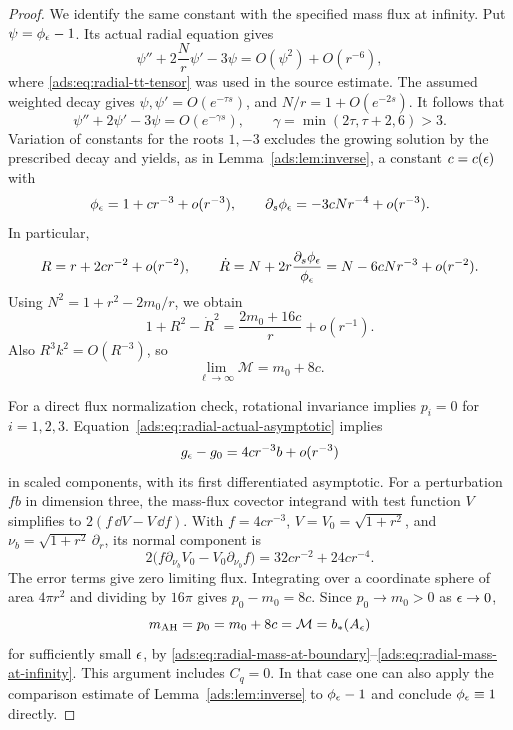 \begin{proof}
We identify the same constant with the specified mass flux at infinity.
Put $\psi=\phi_\epsilon-1$.  Its actual radial equation gives
\[
 \psi''+2\frac Nr\psi'-3\psi
 =O(\psi^2)+O(r^{-6}),
\]
where \eqref{ads:eq:radial-tt-tensor} was used in the source estimate.
The assumed weighted decay gives
$\psi,\psi'=O(e^{-\tau s})$, and $N/r=1+O(e^{-2s})$.
It follows that
\[
 \psi''+2\psi'-3\psi=O(e^{-\gamma s}),
 \qquad \gamma=\min(2\tau,\tau+2,6)>3.
\]
Variation of constants for the roots $1,-3$ excludes the growing
solution by the prescribed decay and yields, as in
Lemma~\ref{ads:lem:inverse}, a constant $c=c(\epsilon)$ with
\begin{equation}
 \phi_\epsilon=1+cr^{-3}+o(r^{-3}),
 \qquad
 \partial_s\phi_\epsilon=-3cNr^{-4}+o(r^{-3}).
 \label{ads:eq:radial-actual-asymptotic}
\end{equation}
In particular,
\[
 R=r+2cr^{-2}+o(r^{-2}),\qquad
 \dot R=N+2r\frac{\partial_s\phi_\epsilon}{\phi_\epsilon}
 =N-6cNr^{-3}+o(r^{-2}).
\]
Using $N^2=1+r^2-2m_0/r$, we obtain
\[
 1+R^2-\dot R^2
 =\frac{2m_0+16c}{r}+o(r^{-1}).
\]
Also $R^3k^2=O(R^{-3})$, so
\begin{equation}
 \lim_{\ell\to\infty}\mathcal M=m_0+8c.
 \label{ads:eq:radial-mass-at-infinity}
\end{equation}

For a direct flux normalization check, rotational invariance implies
$p_i=0$ for $i=1,2,3$.
Equation~\eqref{ads:eq:radial-actual-asymptotic} implies
\[
 g_\epsilon-g_0=4cr^{-3}b+o(r^{-3})
\]
in scaled components, with its first differentiated asymptotic.
For a perturbation $fb$ in dimension three, the mass-flux covector
integrand with test function $V$ simplifies to
$2(f\,\dd V-V\,\dd f)$.
With $f=4cr^{-3}$, $V=V_0=\sqrt{1+r^2}$, and
$\nu_b=\sqrt{1+r^2}\,\partial_r$, its normal component is
\[
 2\bigl(f\partial_{\nu_b}V_0
       -V_0\partial_{\nu_b}f\bigr)
 =32cr^{-2}+24cr^{-4}.
\]
The error terms give zero limiting flux.  Integrating over a coordinate
sphere of area $4\pi r^2$ and dividing by $16\pi$ gives
$p_0-m_0=8c$.
Since $p_0\to m_0>0$ as $\epsilon\to0$,
\[
 m_{\mathrm{AH}}=p_0=m_0+8c=\mathcal M=b_*(A_\epsilon)
\]
for sufficiently small $\epsilon$, by
\eqref{ads:eq:radial-mass-at-boundary}--\eqref{ads:eq:radial-mass-at-infinity}.
This argument includes $C_q=0$.  In that case one can also apply the
comparison estimate of Lemma~\ref{ads:lem:inverse} to $\phi_\epsilon-1$
and conclude $\phi_\epsilon\equiv1$ directly.
\end{proof}

